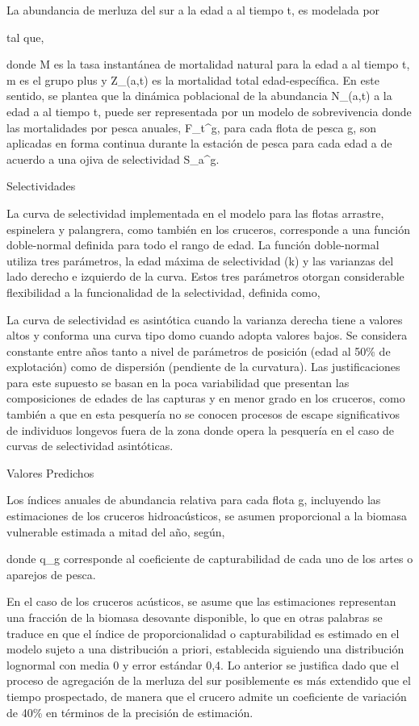 \documentclass[
  spanish,
]{article}
\begin{document}
La abundancia de merluza del sur a la edad a al tiempo t, es modelada
por

tal que,

donde M es la tasa instantánea de mortalidad natural para la edad a al
tiempo t, m es el grupo plus y Z\_(a,t) es la mortalidad total
edad-específica. En este sentido, se plantea que la dinámica poblacional
de la abundancia N\_(a,t) a la edad a al tiempo t, puede ser
representada por un modelo de sobrevivencia donde las mortalidades por
pesca anuales, F\_t\^{}g, para cada flota de pesca g, son aplicadas en
forma continua durante la estación de pesca para cada edad a de acuerdo
a una ojiva de selectividad S\_a\^{}g.

Selectividades

La curva de selectividad implementada en el modelo para las flotas
arrastre, espinelera y palangrera, como también en los cruceros,
corresponde a una función doble-normal definida para todo el rango de
edad. La función doble-normal utiliza tres parámetros, la edad máxima de
selectividad (k) y las varianzas del lado derecho e izquierdo de la
curva. Estos tres parámetros otorgan considerable flexibilidad a la
funcionalidad de la selectividad, definida como,

La curva de selectividad es asintótica cuando la varianza derecha tiene
a valores altos y conforma una curva tipo domo cuando adopta valores
bajos. Se considera constante entre años tanto a nivel de parámetros de
posición (edad al 50\% de explotación) como de dispersión (pendiente de
la curvatura). Las justificaciones para este supuesto se basan en la
poca variabilidad que presentan las composiciones de edades de las
capturas y en menor grado en los cruceros, como también a que en esta
pesquería no se conocen procesos de escape significativos de individuos
longevos fuera de la zona donde opera la pesquería en el caso de curvas
de selectividad asintóticas.

Valores Predichos

Los índices anuales de abundancia relativa para cada flota g, incluyendo
las estimaciones de los cruceros hidroacústicos, se asumen proporcional
a la biomasa vulnerable estimada a mitad del año, según,

donde q\_g corresponde al coeficiente de capturabilidad de cada uno de
los artes o aparejos de pesca.

En el caso de los cruceros acústicos, se asume que las estimaciones
representan una fracción de la biomasa desovante disponible, lo que en
otras palabras se traduce en que el índice de proporcionalidad o
capturabilidad es estimado en el modelo sujeto a una distribución a
priori, establecida siguiendo una distribución lognormal con media 0 y
error estándar 0,4. Lo anterior se justifica dado que el proceso de
agregación de la merluza del sur posiblemente es más extendido que el
tiempo prospectado, de manera que el crucero admite un coeficiente de
variación de 40\% en términos de la precisión de estimación.
\end{document}

